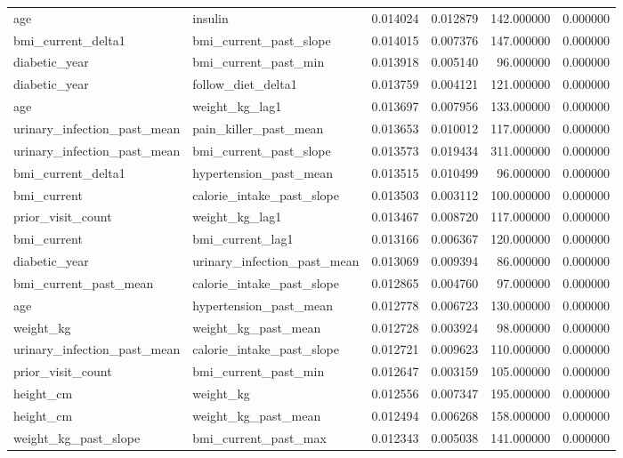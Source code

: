 \begin{longtable}{llrrrr}
age & insulin & 0.014024 & 0.012879 & 142.000000 & 0.000000 \\
bmi\_current\_delta1 & bmi\_current\_past\_slope & 0.014015 & 0.007376 & 147.000000 & 0.000000 \\
diabetic\_year & bmi\_current\_past\_min & 0.013918 & 0.005140 & 96.000000 & 0.000000 \\
diabetic\_year & follow\_diet\_delta1 & 0.013759 & 0.004121 & 121.000000 & 0.000000 \\
age & weight\_kg\_lag1 & 0.013697 & 0.007956 & 133.000000 & 0.000000 \\
urinary\_infection\_past\_mean & pain\_killer\_past\_mean & 0.013653 & 0.010012 & 117.000000 & 0.000000 \\
urinary\_infection\_past\_mean & bmi\_current\_past\_slope & 0.013573 & 0.019434 & 311.000000 & 0.000000 \\
bmi\_current\_delta1 & hypertension\_past\_mean & 0.013515 & 0.010499 & 96.000000 & 0.000000 \\
bmi\_current & calorie\_intake\_past\_slope & 0.013503 & 0.003112 & 100.000000 & 0.000000 \\
prior\_visit\_count & weight\_kg\_lag1 & 0.013467 & 0.008720 & 117.000000 & 0.000000 \\
bmi\_current & bmi\_current\_lag1 & 0.013166 & 0.006367 & 120.000000 & 0.000000 \\
diabetic\_year & urinary\_infection\_past\_mean & 0.013069 & 0.009394 & 86.000000 & 0.000000 \\
bmi\_current\_past\_mean & calorie\_intake\_past\_slope & 0.012865 & 0.004760 & 97.000000 & 0.000000 \\
age & hypertension\_past\_mean & 0.012778 & 0.006723 & 130.000000 & 0.000000 \\
weight\_kg & weight\_kg\_past\_mean & 0.012728 & 0.003924 & 98.000000 & 0.000000 \\
urinary\_infection\_past\_mean & calorie\_intake\_past\_slope & 0.012721 & 0.009623 & 110.000000 & 0.000000 \\
prior\_visit\_count & bmi\_current\_past\_min & 0.012647 & 0.003159 & 105.000000 & 0.000000 \\
height\_cm & weight\_kg & 0.012556 & 0.007347 & 195.000000 & 0.000000 \\
height\_cm & weight\_kg\_past\_mean & 0.012494 & 0.006268 & 158.000000 & 0.000000 \\
weight\_kg\_past\_slope & bmi\_current\_past\_max & 0.012343 & 0.005038 & 141.000000 & 0.000000 \\

\end{longtable}
